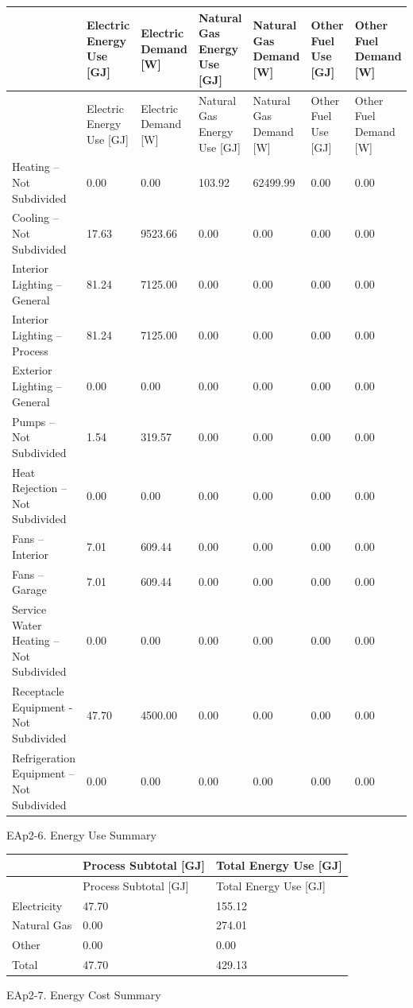 \begin{longtable}[c]{>{\raggedright}p{0.85in}>{\raggedright}p{0.85in}>{\raggedright}p{0.85in}>{\raggedright}p{0.85in}>{\raggedright}p{0.85in}>{\raggedright}p{0.85in}>{\raggedright}p{0.85in}}
\toprule
 & Electric Energy Use [GJ] & Electric Demand [W] & Natural Gas Energy Use [GJ] & Natural Gas Demand [W] & Other Fuel Use [GJ] & Other Fuel Demand [W] \tabularnewline
\midrule
\endfirsthead

\toprule
 & Electric Energy Use [GJ] & Electric Demand [W] & Natural Gas Energy Use [GJ] & Natural Gas Demand [W] & Other Fuel Use [GJ] & Other Fuel Demand [W] \tabularnewline
\midrule
\endhead

Heating -- Not Subdivided  & 0.00 & 0.00 & 103.92 & 62499.99 & 0.00 & 0.00 \tabularnewline
Cooling -- Not Subdivided  & 17.63 & 9523.66 & 0.00 & 0.00 & 0.00 & 0.00 \tabularnewline
Interior Lighting -- General & 81.24 & 7125.00 & 0.00 & 0.00 & 0.00 & 0.00 \tabularnewline
Interior Lighting -- Process & 81.24 & 7125.00 & 0.00 & 0.00 & 0.00 & 0.00 \tabularnewline
Exterior Lighting -- General  & 0.00 & 0.00 & 0.00 & 0.00 & 0.00 & 0.00 \tabularnewline
Pumps -- Not Subdivided  & 1.54 & 319.57 & 0.00 & 0.00 & 0.00 & 0.00 \tabularnewline
Heat Rejection -- Not Subdivided  & 0.00 & 0.00 & 0.00 & 0.00 & 0.00 & 0.00 \tabularnewline
Fans -- Interior  & 7.01 & 609.44 & 0.00 & 0.00 & 0.00 & 0.00 \tabularnewline
Fans -- Garage  & 7.01 & 609.44 & 0.00 & 0.00 & 0.00 & 0.00 \tabularnewline
Service Water Heating  -- Not Subdivided & 0.00 & 0.00 & 0.00 & 0.00 & 0.00 & 0.00 \tabularnewline
Receptacle Equipment - Not Subdivided& 47.70 & 4500.00 & 0.00 & 0.00 & 0.00 & 0.00 \tabularnewline
Refrigeration Equipment -- Not Subdivided & 0.00 & 0.00 & 0.00 & 0.00 & 0.00 & 0.00 \tabularnewline
\bottomrule
\end{longtable}


EAp2-6. Energy Use Summary

\begin{longtable}[c]{@{}lll@{}}
\toprule
 & Process Subtotal [GJ] & Total Energy Use [GJ] \tabularnewline
\midrule
\endfirsthead

\toprule
 & Process Subtotal [GJ] & Total Energy Use [GJ] \tabularnewline
\midrule
\endhead

Electricity & 47.70 & 155.12 \tabularnewline
Natural Gas & 0.00 & 274.01 \tabularnewline
Other & 0.00 & 0.00 \tabularnewline
Total & 47.70 & 429.13 \tabularnewline
\bottomrule
\end{longtable}

EAp2-7. Energy Cost Summary

